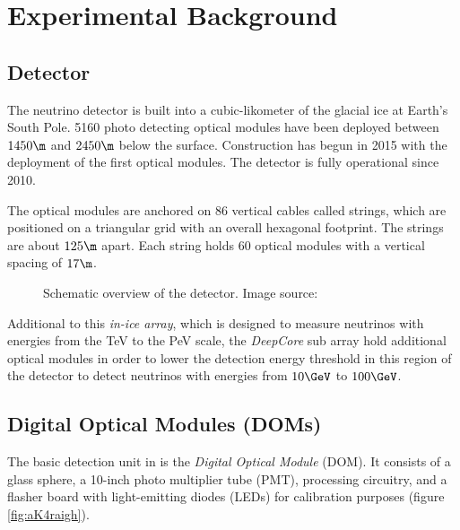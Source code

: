 
\section{Experimental Background}
\label{sec:experimental_background}

\subsection{\icecube Detector}

The \icecube neutrino detector is built into a cubic-likometer of the glacial ice at Earth's South Pole. 5160 photo detecting optical modules have been deployed between $1450\m$ and $2450\m$ below the surface. Construction has begun in 2015 with the deployment of the first optical modules. The detector is fully operational since 2010. \cite{instrumentation}

The optical modules are anchored on 86 vertical cables called strings, which are positioned on a triangular grid with an overall hexagonal footprint. The strings are about $125\m$ apart. Each string holds 60 optical modules with a vertical spacing of $17\m$. \cite{instrumentation}

\begin{figure}[htbp]
  \caption{Schematic overview of the \icecube detector. Image source: \cite{instrumentation}}
  \label{fig:aiThai0e}
\end{figure}

Additional to this \textit{in-ice array}, which is designed to measure neutrinos with energies from the TeV to the PeV scale, the \textit{DeepCore} sub array hold additional optical modules in order to lower the detection energy threshold in this region of the detector to detect neutrinos with energies from $10\GeV$ to $100\GeV$. \cite{instrumentation}


\subsection{Digital Optical Modules (DOMs)}
\label{sec:doms}

The basic detection unit in \icecube is the \textit{Digital Optical Module} (DOM). It consists of a glass sphere, a 10-inch photo multiplier tube (PMT), processing circuitry, and a flasher board with light-emitting diodes (LEDs) for calibration purposes (figure \ref{fig:aK4raigh}). \cite{instrumentation}

